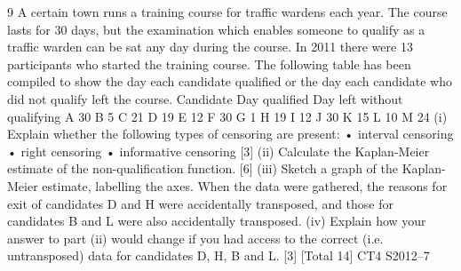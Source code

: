 9 A certain town runs a training course for traffic wardens each year. The course lasts
for 30 days, but the examination which enables someone to qualify as a traffic warden
can be sat any day during the course. In 2011 there were 13 participants who started
the training course. The following table has been compiled to show the day each
candidate qualified or the day each candidate who did not qualify left the course.
Candidate Day qualified Day left without
qualifying
A 30
B 5
C 21
D 19
E 12
F 30
G 1
H 19
I 12
J 30
K 15
L 10
M 24
(i) Explain whether the following types of censoring are present:
• interval censoring
• right censoring
• informative censoring
[3]
(ii) Calculate the Kaplan-Meier estimate of the non-qualification function. [6]
(iii) Sketch a graph of the Kaplan-Meier estimate, labelling the axes. 
When the data were gathered, the reasons for exit of candidates D and H were
accidentally transposed, and those for candidates B and L were also accidentally
transposed.
(iv) Explain how your answer to part (ii) would change if you had access to the
correct (i.e. untransposed) data for candidates D, H, B and L. [3]
[Total 14]
CT4 S2012–7
